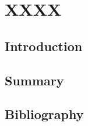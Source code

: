 \chapter{XXXX}
\cleardoublepage

\minitoc

\section{Introduction}
\begin{refsection}
\label{chX:Introduction}
\lipsum

\section{Summary}
\label{chX:Summary}
\lipsum

\cleardoublepage
\section{Bibliography}
\label{chX:bib}
\printbibliography[heading=subbibliography]
\end{refsection}